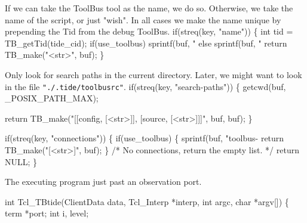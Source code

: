 If we can take the ToolBus tool as the name, we do so.
Otherwise, we take the name of the script, or just "wish".
In all cases we make the name unique by prepending the
Tid from the debug ToolBus.
\nwenddocs{}\endmoddef
  if(streq(key, "name")) \{
    int tid = TB_getTid(tide_cid);
    if(use_toolbus)
      sprintf(buf, "%
    else
      sprintf(buf, "%
    return TB_make("<str>", buf);
  \}
\nwendcode{}\nwdocspar

Only look for search paths in the current directory. Later, we
might want to look in the file {\tt "./.tide/toolbusrc"}.
\nwenddocs{}\endmoddef
  if(streq(key, "search-paths")) \{
    getcwd(buf, _POSIX_PATH_MAX);

    return TB_make("[[config, [<str>]], [source, [<str>]]]", buf, buf);
  \}
\nwendcode{}\nwdocspar

\nwenddocs{}\endmoddef
  if(streq(key, "connections")) \{
    if(use_toolbus) \{
      sprintf(buf, "toolbus-%
      return TB_make("[<str>]", buf);
    \}
    /* No connections, return the empty list. */
    return NULL;
  \}
\nwendcode{}\nwdocspar



The executing program just past an observation port.

\nwenddocs{}\endmoddef\let\nwnotused=\nwoutput{}
int Tcl_TBtide(ClientData data, Tcl_Interp *interp, int argc, char *argv[])
\{
  term *port;
  int i, level;


